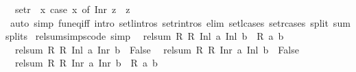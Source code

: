 \begin{isabellebody}
\ \ {\isachardoublequoteopen}setr\ {\isacharequal}{\kern0pt}\ {\isacharparenleft}{\kern0pt}{\isasymlambda}x{\isachardot}{\kern0pt}\ case\ x\ of\ Inr\ z\ {\isasymRightarrow}\ {\isacharbraceleft}{\kern0pt}z{\isacharbraceright}{\kern0pt}\ {\isacharbar}{\kern0pt}\ {\isacharunderscore}{\kern0pt}\ {\isasymRightarrow}\ {\isacharbraceleft}{\kern0pt}{\isacharbraceright}{\kern0pt}{\isacharparenright}{\kern0pt}{\isachardoublequoteclose}\isanewline
%
\isadelimproof
\ \ %
\endisadelimproof
%
\isatagproof
{}\isamarkupfalse%
\ {\isacharparenleft}{\kern0pt}auto\ simp{\isacharcolon}{\kern0pt}\ fun{\isacharunderscore}{\kern0pt}eq{\isacharunderscore}{\kern0pt}iff\ intro{\isacharcolon}{\kern0pt}\ setl{\isachardot}{\kern0pt}intros\ setr{\isachardot}{\kern0pt}intros\ elim{\isacharcolon}{\kern0pt}\ setl{\isachardot}{\kern0pt}cases\ setr{\isachardot}{\kern0pt}cases\ split{\isacharcolon}{\kern0pt}\ sum{\isachardot}{\kern0pt}splits{\isacharparenright}{\kern0pt}%
\endisatagproof
{\isafoldproof}%
%
\isadelimproof
\isanewline
%
\endisadelimproof
\isanewline
{}\isamarkupfalse%
\ rel{\isacharunderscore}{\kern0pt}sum{\isacharunderscore}{\kern0pt}simps{\isacharbrackleft}{\kern0pt}code{\isacharcomma}{\kern0pt}\ simp{\isacharbrackright}{\kern0pt}{\isacharcolon}{\kern0pt}\isanewline
\ \ {\isachardoublequoteopen}rel{\isacharunderscore}{\kern0pt}sum\ R{}\ R{}\ {\isacharparenleft}{\kern0pt}Inl\ a{}{\isacharparenright}{\kern0pt}\ {\isacharparenleft}{\kern0pt}Inl\ b{}{\isacharparenright}{\kern0pt}\ {\isacharequal}{\kern0pt}\ R{}\ a{}\ b{}{\isachardoublequoteclose}\isanewline
\ \ {\isachardoublequoteopen}rel{\isacharunderscore}{\kern0pt}sum\ R{}\ R{}\ {\isacharparenleft}{\kern0pt}Inl\ a{}{\isacharparenright}{\kern0pt}\ {\isacharparenleft}{\kern0pt}Inr\ b{}{\isacharparenright}{\kern0pt}\ {\isacharequal}{\kern0pt}\ False{\isachardoublequoteclose}\isanewline
\ \ {\isachardoublequoteopen}rel{\isacharunderscore}{\kern0pt}sum\ R{}\ R{}\ {\isacharparenleft}{\kern0pt}Inr\ a{}{\isacharparenright}{\kern0pt}\ {\isacharparenleft}{\kern0pt}Inl\ b{}{\isacharparenright}{\kern0pt}\ {\isacharequal}{\kern0pt}\ False{\isachardoublequoteclose}\isanewline
\ \ {\isachardoublequoteopen}rel{\isacharunderscore}{\kern0pt}sum\ R{}\ R{}\ {\isacharparenleft}{\kern0pt}Inr\ a{}{\isacharparenright}{\kern0pt}\ {\isacharparenleft}{\kern0pt}Inr\ b{}{\isacharparenright}{\kern0pt}\ {\isacharequal}{\kern0pt}\ R{}\ a{}\ b{}{\isachardoublequoteclose}\isanewline

\end{isabellebody}

